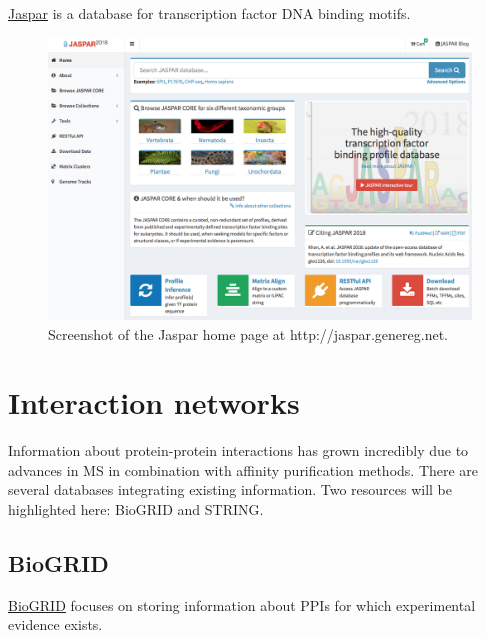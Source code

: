 \documentclass[]{book}
\theoremstyle{definition}
\theoremstyle{definition}
\theoremstyle{definition}
\theoremstyle{remark}
\begin{document}
\href{http://jaspar.genereg.net}{Jaspar} is a database for transcription
factor DNA binding motifs.

\begin{figure}
\includegraphics[width=17.03in]{pic/jaspar_web} \caption{Screenshot of the Jaspar home page at http://jaspar.genereg.net.}\label{fig:jaspar-web}
\end{figure}

\section{Interaction networks}\label{interaction-networks}

Information about protein-protein interactions has grown incredibly due
to advances in MS in combination with affinity purification methods.
There are several databases integrating existing information. Two
resources will be highlighted here: BioGRID and STRING.

\subsection{BioGRID}\label{biogrid}

\href{https://thebiogrid.org}{BioGRID} focuses on storing information
about PPIs for which experimental evidence exists.
\end{document}

